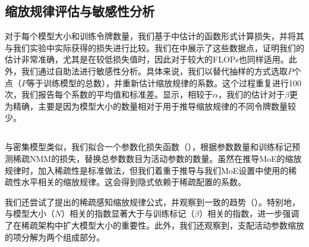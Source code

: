 \subsection{缩放规律评估与敏感性分析}

对于每个模型大小和训练令牌数量，我们基于中估计的函数形式计算损失，并将其与我们实验中实际获得的损失进行比较。我们在中展示了这些数据点，证明我们的估计非常准确，尤其是在较低损失值时，因此对于较大的FLOPs也同样适用。此外，我们通过自助法进行敏感性分析。具体来说，我们以替代抽样的方式选取\( P \)个点（\( P \)等于训练模型的总数），并重新估计缩放规律的系数。这个过程重复进行100次，我们报告每个系数的平均值和标准差。显示，相较于\(\alpha\)，我们的估计对于\(\beta\)更为精确，主要是因为模型大小的数量相对于用于推导缩放规律的不同令牌数量较少。 

\begin{table}[htb]
    \centering
    \setlength{\tabcolsep}{16pt}
    \renewcommand{\arraystretch}{1}
    \caption{\textbf{规模规律的敏感性.} 我们报告了经过 100 次迭代的自助法后的均值和标准差.}
    \label{tab:scaling_laws_sensitivity}
\end{table}
\subsection{}
\label{app:scaling_laws_moes}

与密集模型类似，我们拟合一个参数化损失函数（），根据参数数量和训练标记预测稀疏NMM的损失，替换总参数数目为活动参数的数量。虽然在推导MoE的缩放规律时，加入稀疏性是标准做法\citep{wangscalingmoe,krajewski2024scalingmoe,abnar2025parameters}，但我们着重于推导与我们MoE设置中使用的稀疏性水平相关的缩放规律。这会得到隐式依赖于稀疏配置的系数。

我们还尝试了\citep{abnar2025parameters}提出的稀疏感知缩放规律公式，并观察到一致的趋势（）。特别地，与模型大小（$N$）相关的指数显著大于与训练标记（$\beta$）相关的指数，进一步强调了在稀疏架构中扩大模型大小的重要性。此外，我们还观察到，支配活动参数缩放的项分解为两个组成部分。

